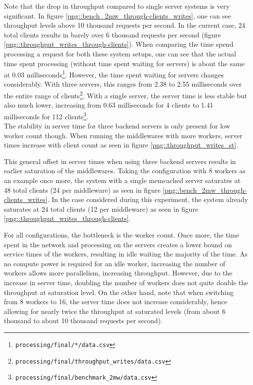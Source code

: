 \documentclass[11pt,a4paper]{article}
\begin{document}
Note that the drop in throughput compared to single server systems is very significant. In figure \ref{png::bench_2mw_through-clients_writes}, one can see throughput levels above 10 thousand requests per second. In the current case, 24 total clients results in barely over 6 thousand requests per second (figure \ref{png::throughput_writes_through-clients}). When comparing the time spend processing a request for both these system setups, one can see that the actual time spent processing (without time spent waiting for servers) is about the same at 0.03 milliseconds\footnote{\texttt{processing/final/*/data.csv}}. However, the time spent waiting for servers changes considerably. With three servers, this ranges from 2.38 to 2.55 milliseconds over the entire range of clients\footnote{\texttt{processing/final/throughput_writes/data.csv}}. With a single server, the server time is less stable but also much lower, increasing from 0.63 milliseconds for 4 clients to 1.41 milliseconds for 112 clients\footnote{\texttt{processing/final/benchmark_2mw/data.csv}}.\\
\indent The stability in server time for three backend servers is only present for low worker count though. When running the middlewares with more workers, server times increase with client count as seen in figure \ref{png::throughput_writes_st}.

This general offset in server times when using three backend servers results in earlier saturation of the middlewares. Taking the configuration with 8 workers as an example once more, the system with a single memcached server saturates at 48 total clients (24 per middleware) as seen in figure \ref{png::bench_2mw_through-clients_writes}. In the case considered during this experiment, the system already saturates at 24 total clients (12 per middleware) as seen in figure \ref{png::throughput_writes_through-clients}.

For all configurations, the bottleneck is the worker count. Once more, the time spent in the network and processing on the servers creates a lower bound on service times of the workers, resulting in idle waiting the majority of the time. As no compute power is required for an idle worker, increasing the number of workers allows more parallelism, increasing throughput. However, due to the increase in server time, doubling the number of workers does not quite double the throughput at saturation level. On the other hand, note that when switching from 8 workers to 16, the server time does not increase considerably, hence allowing for nearly twice the throughput at saturated levels (from about 6 thousand to about 10 thousand requests per second).
\end{document}
